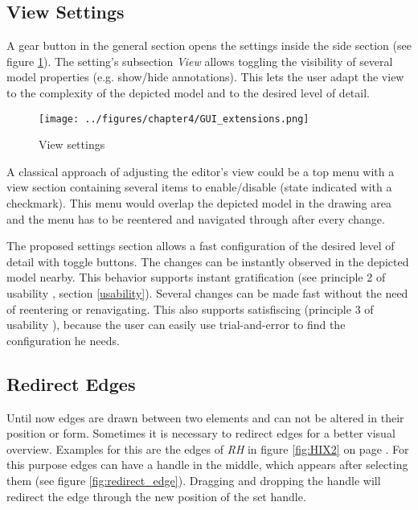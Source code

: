 \documentclass[twoside, openright, 12pt]{book}
\begin{document}
\subsection{View Settings}
\label{editor_extension_settings}
A gear button in the general section opens the settings inside the side section (see figure \ref{fig:GUI_extensions}).
The setting's subsection \textit{View} allows toggling the visibility of several model properties (e.g. show/hide annotations).
This lets the user adapt the view to the complexity of the depicted model and to the desired level of detail.

\begin{figure}[htb]
	\centering
	\texttt{[image: ../figures/chapter4/GUI\_extensions.png]}
	\caption{View settings}
	\label{fig:GUI_extensions}
\end{figure}

\noindent
A classical approach of adjusting the editor's view could be a top menu with a view section containing several items to enable/disable (state indicated with a checkmark).
This menu would overlap the depicted model in the drawing area and the menu has to be reentered and navigated through after every change.

The proposed settings section allows a fast configuration of the desired level of detail with toggle buttons.
The changes can be instantly observed in the depicted model nearby.
This behavior supports instant gratification (see principle 2 of usability \citep{Tidwell11}, section \ref{usability}).
Several changes can be made fast without the need of reentering or renavigating.
This also supports satisfiscing (principle 3 of usability \citep{Tidwell11}), because the user can easily use trial-and-error to find the configuration he needs.


\subsection{Redirect Edges}
\label{editor_extension_redirect_edges}
Until now edges are drawn between two elements and can not be altered in their position or form.
Sometimes it is necessary to redirect edges for a better visual overview.
Examples for this are the edges of \textit{RH} in figure \ref{fig:HIX2} on page \pageref{fig:HIX2}.
For this purpose edges can have a handle in the middle, which appears after selecting them (see figure \ref{fig:redirect_edge}).
Dragging and dropping the handle will redirect the edge through the new position of the set handle.
\end{document}
